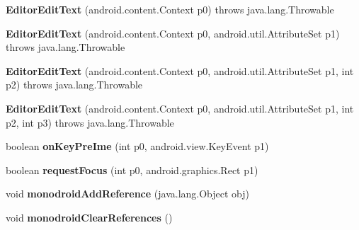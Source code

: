 \begin{DoxyCompactItemize}
\item 
\mbox{\label{classmd5b60ffeb829f638581ab2bb9b1a7f4f3f_1_1_editor_edit_text_af867d7b8157b5de4238185bf6f6676bf}} 
{\bfseries Editor\+Edit\+Text} (android.\+content.\+Context p0)  throws java.\+lang.\+Throwable 	
\item 
\mbox{\label{classmd5b60ffeb829f638581ab2bb9b1a7f4f3f_1_1_editor_edit_text_acecda8e695b3aabe8c8cf239e9a086c4}} 
{\bfseries Editor\+Edit\+Text} (android.\+content.\+Context p0, android.\+util.\+Attribute\+Set p1)  throws java.\+lang.\+Throwable 	
\item 
\mbox{\label{classmd5b60ffeb829f638581ab2bb9b1a7f4f3f_1_1_editor_edit_text_a0f6e1c351c540635b51c75ed5cc7ef59}} 
{\bfseries Editor\+Edit\+Text} (android.\+content.\+Context p0, android.\+util.\+Attribute\+Set p1, int p2)  throws java.\+lang.\+Throwable 	
\item 
\mbox{\label{classmd5b60ffeb829f638581ab2bb9b1a7f4f3f_1_1_editor_edit_text_aa96dd97388dccea5ef79dc06281b4d07}} 
{\bfseries Editor\+Edit\+Text} (android.\+content.\+Context p0, android.\+util.\+Attribute\+Set p1, int p2, int p3)  throws java.\+lang.\+Throwable 	
\item 
\mbox{\label{classmd5b60ffeb829f638581ab2bb9b1a7f4f3f_1_1_editor_edit_text_a0b8c2d984435a0a18af27ebb700d3e63}} 
boolean {\bfseries on\+Key\+Pre\+Ime} (int p0, android.\+view.\+Key\+Event p1)
\item 
\mbox{\label{classmd5b60ffeb829f638581ab2bb9b1a7f4f3f_1_1_editor_edit_text_a209907be3186e7a88c89adcbbe20cd17}} 
boolean {\bfseries request\+Focus} (int p0, android.\+graphics.\+Rect p1)
\item 
\mbox{\label{classmd5b60ffeb829f638581ab2bb9b1a7f4f3f_1_1_editor_edit_text_a2d346ebbcec03d19cb05949a57c42ca2}} 
void {\bfseries monodroid\+Add\+Reference} (java.\+lang.\+Object obj)
\item 
\mbox{\label{classmd5b60ffeb829f638581ab2bb9b1a7f4f3f_1_1_editor_edit_text_aacf56440a58971488b7292ee85983d77}} 
void {\bfseries monodroid\+Clear\+References} ()
\end{DoxyCompactItemize}

